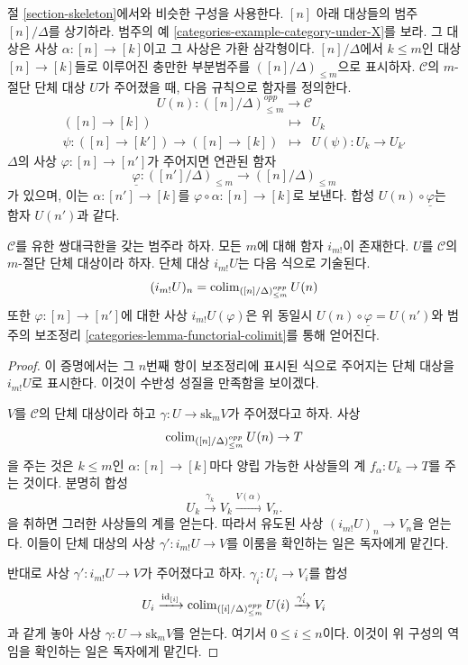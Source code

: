 \medskip\noindent
절 \ref{section-skeleton}에서와 비슷한 구성을 사용한다.
$[n]$ 아래 대상들의 범주 $[n]/\Delta$를 상기하라. 범주의 예
\ref{categories-example-category-under-X}를 보라. 그 대상은 사상
$\alpha : [n] \to [k]$이고 그 사상은 가환 삼각형이다.
$[n]/\Delta$에서 $k \leq m$인 대상 $[n] \to [k]$들로 이루어진
충만한 부분범주를 $([n]/\Delta)_{\leq m}$으로 표시하자.
$\mathcal{C}$의 $m$-절단 단체 대상 $U$가 주어졌을 때, 다음 규칙으로
함자를 정의한다.
$$
U(n) : ([n]/\Delta)_{\leq m}^{opp} \longrightarrow \mathcal{C}
$$
\begin{eqnarray*}
([n] \to [k]) & \longmapsto & U_k \\
\psi : ([n] \to [k']) \to ([n] \to [k])
& \longmapsto &
U(\psi) : U_k \to U_{k'}
\end{eqnarray*}
$\Delta$의 사상 $\varphi : [n] \to [n']$가 주어지면 연관된 함자
$$
\underline{\varphi} :
([n']/\Delta)_{\leq m}
\longrightarrow
([n]/\Delta)_{\leq m}
$$
가 있으며, 이는 $\alpha : [n'] \to [k]$를
$\varphi \circ \alpha : [n] \to [k]$로 보낸다. 합성
$U(n) \circ \underline{\varphi}$는 함자 $U(n')$과 같다.

\begin{lemma}
\label{lemma-left-adjoint-exists}
$\mathcal{C}$를 유한 쌍대극한을 갖는 범주라 하자. 모든 $m$에 대해
함자 $i_{m!}$이 존재한다. $U$를 $\mathcal{C}$의 $m$-절단 단체 대상이라
하자. 단체 대상 $i_{m!}U$는 다음 식으로 기술된다.
$$
(i_{m!}U)_n = \mathop{\mathrm{colim}}\nolimits_{([n]/\Delta)_{\leq m}^{opp}} U(n)
$$
또한 $\varphi : [n] \to [n']$에 대한 사상 $i_{m!}U(\varphi)$은
위 동일시 $U(n) \circ \underline{\varphi} = U(n')$와 범주의 보조정리
\ref{categories-lemma-functorial-colimit}를 통해 얻어진다.
\end{lemma}

\begin{proof}
이 증명에서는 그 $n$번째 항이 보조정리에 표시된 식으로 주어지는
단체 대상을 $i_{m!}U$로 표시한다. 이것이 수반성 성질을 만족함을 보이겠다.

\medskip\noindent
$V$를 $\mathcal{C}$의 단체 대상이라 하고
$\gamma : U \to \text{sk}_mV$가 주어졌다고 하자. 사상
$$
\mathop{\mathrm{colim}}\nolimits_{([n]/\Delta)_{\leq m}^{opp}} U(n) \to T
$$
을 주는 것은 $k \leq m$인 $\alpha : [n] \to [k]$마다 양립 가능한
사상들의 계 $f_\alpha : U_k \to T$를 주는 것이다. 분명히 합성
$$
U_k \xrightarrow{\gamma_k} V_k \xrightarrow{V(\alpha)} V_n.
$$
을 취하면 그러한 사상들의 계를 얻는다. 따라서 유도된 사상
$(i_{m!}U)_n \to V_n$을 얻는다. 이들이 단체 대상의 사상
$\gamma' : i_{m!}U \to V$를 이룸을 확인하는 일은 독자에게 맡긴다.

\medskip\noindent
반대로 사상 $\gamma' : i_{m!}U \to V$가 주어졌다고 하자.
$\gamma_i : U_i \to V_i$를 합성
$$
U_i
\xrightarrow{\text{id}_{[i]}}
\mathop{\mathrm{colim}}\nolimits_{([i]/\Delta)_{\leq m}^{opp}} U(i)
\xrightarrow{\gamma'_i}
V_i
$$
과 같게 놓아 사상 $\gamma : U \to \text{sk}_m V$를 얻는다.
여기서 $0 \leq i \leq n$이다. 이것이 위 구성의 역임을 확인하는 일은
독자에게 맡긴다.
\end{proof}

